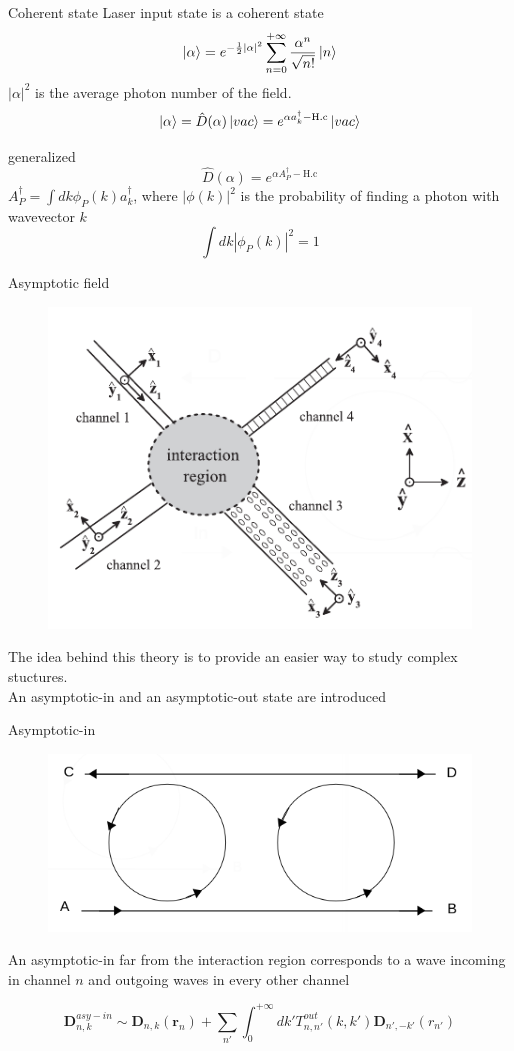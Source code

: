 \documentclass{beamer}
\renewcommand{\r}{\mathbf{r}}
\begin{document}
\begin{frame}[plain]{Coherent state}
Laser input state is a coherent state
\begin{equation}
\ket{\alpha} = e^{-\frac{1}{2}|\alpha|^2}\sum_{n=0}^{+\infty} \frac{\alpha^n}{\sqrt{n!}}\ket{n}
\end{equation}
$|\alpha|^2$ is the average photon number of the field.\\


\begin{equation}
\ket{\alpha} = \hat{D}(\alpha)\ket{vac}  = e^{\alpha a_k^\dagger -\text{H.c}} \ket{vac}
\end{equation}

generalized
\begin{equation}\hat{D}(\alpha) = e^{\alpha A^\dagger_P -\text{H.c}}\end{equation}
$A^\dagger_P = \int dk \phi_P(k) a_k^\dagger$, where $|\phi(k)|^2$ is the probability of finding a photon with wavevector $k$
\[\int dk |\phi_P(k)|^2 = 1\]
\end{frame}


\begin{frame}[plain]{Asymptotic field}
\begin{figure}
\centering
\includegraphics[width = .5\textwidth]{asymptotic}
\end{figure}
The idea behind this theory is to provide an easier way to study complex stuctures.\\
An asymptotic-in and an asymptotic-out state are introduced 

\end{frame}


\begin{frame}[plain]{Asymptotic-in}
\begin{figure}
\centering
\includegraphics[width = .5\textwidth]{Asyina2}
\end{figure}
An asymptotic-in far from the interaction region corresponds to a wave incoming in channel $n$ and outgoing waves in every other channel

\begin{equation}\label{asyin}\mathbf{D}^{asy-in}_{n,k} \sim \mathbf{D}_{n,k}(\r_n) + \sum_{n'}\int_{0}^{+\infty}dk' T^{out}_{n,n'}(k,k')\mathbf{D}_{n',-k'}(r_{n'})\end{equation}

\end{frame}
\end{document}

